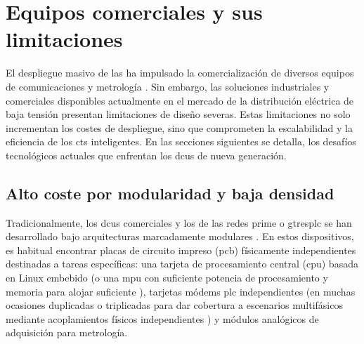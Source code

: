 \section{Equipos comerciales y sus limitaciones}
\label{sec:equipos_comerciales}

El despliegue masivo de las  ha impulsado la comercialización de diversos equipos de comunicaciones y metrología \cite{5764444}. Sin embargo, las soluciones industriales y comerciales disponibles actualmente en el mercado de la distribución eléctrica de baja tensión presentan limitaciones de diseño severas. Estas limitaciones no solo incrementan los costes de despliegue, sino que comprometen la escalabilidad y la eficiencia de los \glspl{ct} inteligentes. En las secciones siguientes se detalla, los desafíos tecnológicos actuales que enfrentan los \glspl{dcu} de nueva generación.

\subsection{Alto coste por modularidad y baja densidad}
\label{subsec:modularidad_baja_densidad}

Tradicionalmente, los \glspl{dcu} comerciales y los  de las redes \gls{prime} o \gls{gtresplc} se han desarrollado bajo arquitecturas marcadamente modulares \cite{6925952}. En estos dispositivos, es habitual encontrar placas de circuito impreso (\gls{pcb}) físicamente independientes destinadas a tareas específicas: una tarjeta de procesamiento central (\gls{cpu}) basada en Linux embebido (o una \gls{mpu} con suficiente potencia de procesamiento y memoria para alojar suficiente ), tarjetas módems \gls{plc} independientes (en muchas ocasiones duplicadas o triplicadas para dar cobertura a escenarios multifásicos mediante acoplamientos físicos independientes \cite{10488780}) y módulos analógicos de adquisición para metrología.

